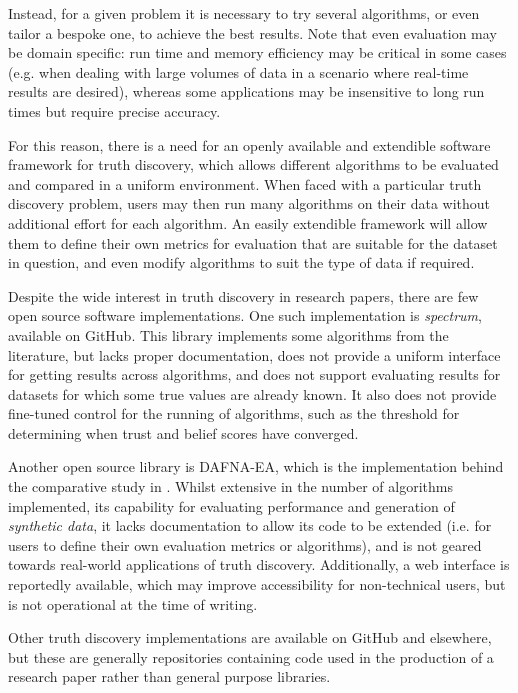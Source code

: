\documentclass[../main.tex]{subfiles}
\begin{document}
Instead, for a given problem it is necessary to try several algorithms, or even
tailor a bespoke one, to achieve the best results. Note that even evaluation
may be domain specific: run time and memory efficiency may be critical in some
cases (e.g. when dealing with large volumes of data in a scenario where
real-time results are desired), whereas some applications may be insensitive to
long run times but require precise accuracy.

For this reason, there is a need for an openly available and extendible
software framework for truth discovery, which allows different algorithms to be
evaluated and compared in a uniform environment. When faced with a particular
truth discovery problem, users may then run many algorithms on their data
without additional effort for each algorithm. An easily extendible framework
will allow them to define their own metrics for evaluation that are suitable
for the dataset in question, and even modify algorithms to suit the type of
data if required.

Despite the wide interest in truth discovery in research papers, there are few
open source software implementations. One such implementation is
\emph{spectrum}\footnotemark{}, available on GitHub. This library implements
some algorithms from the literature, but lacks proper documentation, does not
provide a uniform interface for getting results across algorithms, and does not
support evaluating results for datasets for which some true values are already
known. It also does not provide fine-tuned control for the running of
algorithms, such as the threshold for determining when trust and belief scores
have converged.


Another open source library is DAFNA-EA\footnotemark{}, which is the
implementation behind the comparative study in \cite{waguih}. Whilst extensive
in the number of algorithms implemented, its capability for evaluating
performance and generation of \emph{synthetic data}, it lacks documentation to
allow its code to be extended (i.e. for users to define their own evaluation
metrics or algorithms), and is not geared towards real-world applications of
truth discovery. Additionally, a web interface is reportedly available, which
may improve accessibility for non-technical users, but is not operational at
the time of writing.


Other truth discovery implementations are available on GitHub and
elsewhere\footnotemark{}, but these are generally repositories containing code
used in the production of a research paper rather than general purpose
libraries.
\end{document}
